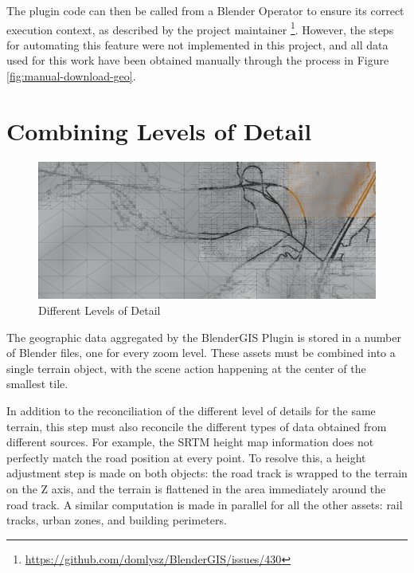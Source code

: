 The plugin code can then be called from a Blender Operator to ensure its correct execution context, as described by the project maintainer \footnote{\url{https://github.com/domlysz/BlenderGIS/issues/430}}. However, the steps for automating this feature were not implemented in this project, and all data used for this work have been obtained manually through the process in Figure \ref{fig:manual-download-geo}.

\section{Combining Levels of Detail}
\label{sec:combine-levels-of-detail}

\begin{figure}[H]
    \centering
    \includegraphics[width=14.5cm]{src/img/pic/pic-1 blender screenshot sat levels of detail.png}
    \caption{Different Levels of Detail }
    \label{fig:impl-levels-of-detail}
\end{figure}

The geographic data aggregated by the BlenderGIS Plugin is stored in a number of Blender files, one for every zoom level. These assets must be combined into a single terrain object, with the scene action happening at the center of the smallest tile.

In addition to the reconciliation of the different level of details for the same terrain, this step must also reconcile the different types of data obtained from different sources. For example, the SRTM height map information does not perfectly match the road position at every point. To resolve this, a height adjustment step is made on both objects: the road track is wrapped to the terrain on the Z axis, and the terrain is flattened in the area immediately around the road track. A similar computation is made in parallel for all the other assets: rail tracks, urban zones, and building perimeters.

